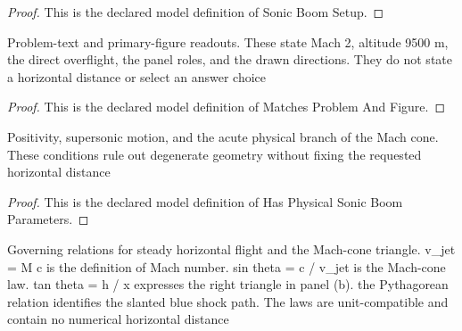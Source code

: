 \begin{proof}
  This is the declared model definition of Sonic Boom Setup.
\end{proof}
\begin{definition}
  \label{def:physics:phyx-mini-0221:phyxminiproblems-problemphyxmini0221-matchesproblemandfigure}
  Problem-text and primary-figure readouts. These state Mach 2, altitude 9500 m, the direct overflight, the panel roles, and the drawn directions. They do not state a horizontal distance or select an answer choice
\end{definition}
\begin{proof}
  This is the declared model definition of Matches Problem And Figure.
\end{proof}
\begin{definition}
  \label{def:physics:phyx-mini-0221:phyxminiproblems-problemphyxmini0221-hasphysicalsonicboomparameters}
  Positivity, supersonic motion, and the acute physical branch of the Mach cone. These conditions rule out degenerate geometry without fixing the requested horizontal distance
\end{definition}
\begin{proof}
  This is the declared model definition of Has Physical Sonic Boom Parameters.
\end{proof}
\begin{definition}
  \label{def:physics:phyx-mini-0221:phyxminiproblems-problemphyxmini0221-satisfiesmachconegeometry}
  Governing relations for steady horizontal flight and the Mach-cone triangle. v\_jet = M c is the definition of Mach number. sin theta = c / v\_jet is the Mach-cone law. tan theta = h / x expresses the right triangle in panel (b). the Pythagorean relation identifies the slanted blue shock path. The laws are unit-compatible and contain no numerical horizontal distance
\end{definition}
